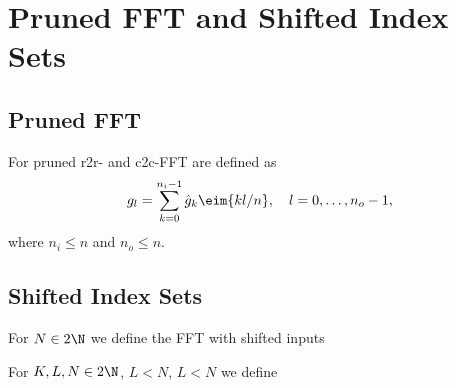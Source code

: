 \section{Pruned FFT and Shifted Index Sets}
\subsection{Pruned FFT}
For pruned r2r- and c2c-FFT are defined as
\begin{equation*}
  g_l = \sum_{k=0}^{n_i-1} \hat g_k \eim{kl/n}, \quad l=0,\hdots,n_o-1,
\end{equation*}
where $n_i\le n$ and $n_o\le n$.

\subsection{Shifted Index Sets}
For $N\in 2\N$ we define the FFT with shifted inputs


For $K,L,N\in 2\N$, $L<N$, $L<N$ we define







